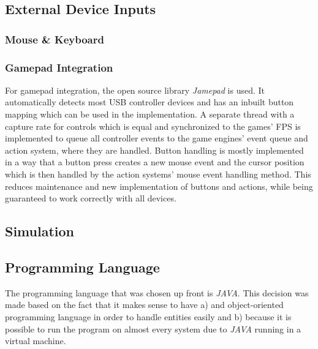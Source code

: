 \subsection{External Device Inputs}\label{subsec:external-device-inputs}
\subsubsection{Mouse \& Keyboard}\label{subsubsec:mouse-&-keyboard}
\subsubsection{Gamepad Integration}\label{subsubsec:gamepad-integration}
For gamepad integration, the open source library \textit{Jamepad} is used.
It automatically detects most USB controller devices and has an inbuilt button mapping which can be used in the implementation.
A separate thread with a capture rate for controls which is equal and synchronized to the games' FPS is implemented to queue all controller
events to the game engines' event queue and action system, where they are handled.
Button handling is mostly implemented in a way that a button press creates a new mouse event and the cursor position which is then handled by the action
systems' mouse event handling method.
This reduces maintenance and new implementation of buttons and actions, while being guaranteed to work correctly with all devices.

\subsection{Simulation}
\subsection{Programming Language}\label{subsec:programming-language}
The programming language that was chosen up front is \textit{JAVA}.
This decision was made based on the fact that it makes sense to have a) and object-oriented programming language in order to
handle entities easily and b) because it is possible to run the program on almost every system due to \textit{JAVA} running
in a virtual machine.



